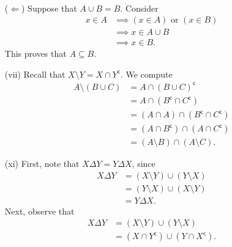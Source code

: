 \documentclass[10pt]{article}
\renewcommand{\lor}{\text{ or }}
\newcommand{\compl}{\mathsf{c}}
\begin{document}
\begin{enumerate}
        ~

        ($\Leftarrow$) Suppose that $A \cup B = B$. Consider \begin{align*}
            x \in A
            &\implies (x \in A) \lor (x \in B) \\
            &\implies x \in A \cup B \\
            &\implies x \in B. \tag{Using $A \cup B = B$}
        \end{align*}
        This proves that $A \subseteq B$.


        \item[(vii)] Recall that $X \setminus Y = X \cap Y^\compl$. We compute
        \begin{align*}
            A \setminus (B \cup C)
            &= A \cap (B \cup C)^\compl \\
            &= A \cap (B^\compl \cap C^\compl) \tag{De Morgan's Law} \\
            &= (A \cap A) \cap (B^\compl \cap C^\compl) \\
            &= (A \cap B^\compl) \cap (A \cap C^\compl) \\
            &= (A \setminus B) \cap (A \setminus C). \tag*{\qed}
        \end{align*}


        \item[(xi)] First, note that $X \Delta Y = Y \Delta X$, since
        \begin{align*}
            X \Delta Y
            &= (X \setminus Y) \cup (Y \setminus X) \\
            &= (Y \setminus X) \cup (X \setminus Y) \tag{Using (i)} \\
            &= Y \Delta X.
        \end{align*} Next, observe that \begin{align*}
            X \Delta Y
            &= (X \setminus Y) \cup (Y \setminus X) \\
            &= (X \cap Y^\compl) \cup (Y \cap X^\compl).
        \end{align*}


\end{enumerate}
\end{document}
